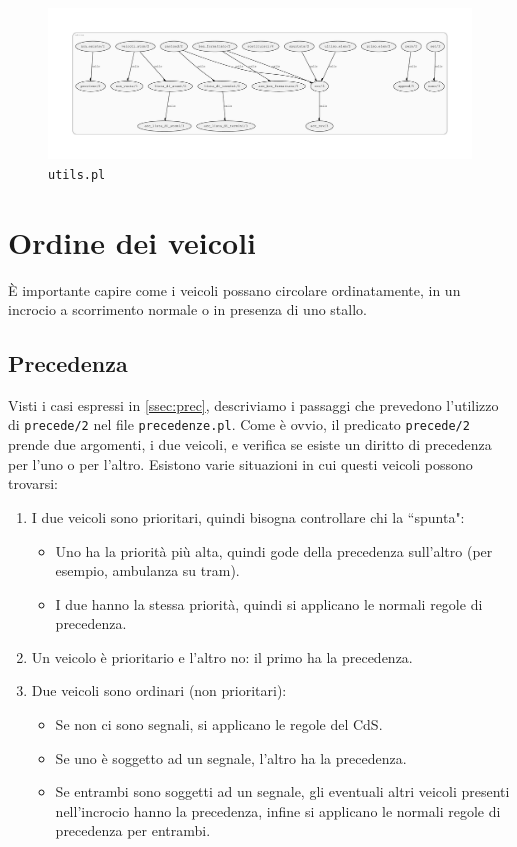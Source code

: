 \begin{figure}
	\includegraphics[width=\textwidth, height=\textheight, keepaspectratio]{diagrams/utils}
	\caption{\texttt{utils.pl}}
\end{figure}

\restoregeometry

\section{Ordine dei veicoli}
È importante capire come i veicoli possano circolare ordinatamente, in un incrocio a scorrimento normale o in presenza di uno stallo.

\subsection{Precedenza}
Visti i casi espressi in \ref{ssec:prec}, descriviamo i passaggi che prevedono l'utilizzo di \texttt{precede/2} nel file \texttt{precedenze.pl}. Come è ovvio, il predicato \texttt{precede/2} prende due argomenti, i due veicoli, e verifica se esiste un diritto di precedenza per l'uno o per l'altro. Esistono varie situazioni in cui questi veicoli possono trovarsi:
\begin{enumerate}
	\item I due veicoli sono prioritari, quindi bisogna controllare chi la ``spunta":
		\begin{itemize}
			\item Uno ha la priorità più alta, quindi gode della precedenza sull'altro (per esempio, ambulanza su tram).
			\item I due hanno la stessa priorità, quindi si applicano le normali regole di precedenza.
		\end{itemize}
	\item Un veicolo è prioritario e l'altro no: il primo ha la precedenza.
	\item Due veicoli sono ordinari (non prioritari):
		\begin{itemize}
			\item Se non ci sono segnali, si applicano le regole del CdS.
			\item Se uno è soggetto ad un segnale, l'altro ha la precedenza.
			\item Se entrambi sono soggetti ad un segnale, gli eventuali altri veicoli presenti nell'incrocio hanno la precedenza, infine si applicano le normali regole di precedenza per entrambi.
		\end{itemize}
\end{enumerate}

